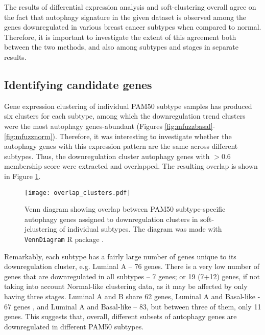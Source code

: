 The results of differential expression analysis and soft-clustering overall agree on the fact that autophagy signature in the given dataset is observed among the genes downregulated in various breast cancer subtypes when compared to normal. Therefore, it is important to investigate the extent of this agreement both between the two methods, and also among subtypes and stages in separate results. 



\subsection{Identifying candidate genes}

Gene expression clustering of individual PAM50 subtype samples has produced six clusters for each subtype, among which the downregulation trend clusters were the most autophagy genes-abundant (Figures \ref{fig:mfuzzbasal}-\ref{fig:mfuzznorm}). Therefore, it was interesting to investigate whether the autophagy genes with this expression pattern are the same across different subtypes. Thus, the downregulation cluster autophagy genes with $>0.6$ membership score were extracted and overlapped. The resulting overlap is shown in Figure \ref{fig:overlapclusters}. \\

            \begin{figure}[!h]
            \centering
            \texttt{[image: overlap\_clusters.pdf]} 
            \caption[Overlap between PAM50 subtype-specific downregulation cluster autophagy genes]{Venn diagram showing overlap between PAM50 subtype-specific autophagy genes assigned to downregulation clusters in soft-jclustering of individual subtypes. The diagram was made with \texttt{VennDiagram} R package \cite{venndiagram}. }
            \label{fig:overlapclusters}
            \end{figure}
            
Remarkably, each subtype has a fairly large number of  genes unique to its downregulation cluster, e.g. Luminal A -- 76 genes. There is a very low number of genes that are downregulated in all subtypes -- 7 genes; or 19 (7+12) genes, if not taking into account Normal-like clustering data, as it may be affected by only having three stages. Luminal A and B share 62 genes, Luminal A and Basal-like - 67 genes , and Luminal A and Basal-like -- 83, but between three of them, only 11 genes. This suggests that, overall, different subsets of autophagy genes are downregulated in different PAM50 subtypes. 



